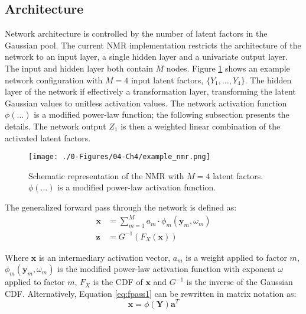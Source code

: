 \subsection{Architecture}
\label{subsec:arch}

Network architecture is controlled by the number of latent factors in the Gaussian pool. The current \gls{NMR} implementation restricts the architecture of the network to an input layer, a single hidden layer and a univariate output layer. The input and hidden layer both contain $M$ nodes. Figure \ref{fig:example_nmr} shows an example network configuration with $M=4$ input latent factors, $\{ Y_{1}, \dots, Y_{4}\}$. The hidden layer of the network if effectively a transformation layer, transforming the latent Gaussian values to unitless activation values. The network activation function $\phi(\dots)$ is a modified power-law function; the following subsection presents the details. The network output $Z_{1}$ is then a weighted linear combination of the activated latent factors.

\begin{figure}[htb!]
    \centering
    \texttt{[image: ./0-Figures/04-Ch4/example\_nmr.png]}
    \caption{Schematic representation of the \gls{NMR} with $M=4$ latent factors. $\phi(\dots)$ is a modified power-law activation function. }
    \label{fig:example_nmr}
\end{figure}

The generalized forward pass through the network is defined as:
\begin{align}
    \label{eq:fpass1}
    \mathbf{x} & = \sum_{m=1}^{M}a_{m} \cdot \phi_{m}(\mathbf{y}_{m}, \omega_{m}) \\
    \label{eq:fpass2}
    \mathbf{z} & = G^{-1}\left( F_{X}\left(\mathbf{x} \right)\right)
\end{align}

Where $\mathbf{x}$ is an intermediary activation vector, $a_{m}$ is a weight applied to factor $m$, $\phi_{m}(\mathbf{y}_{m}, \omega_{m})$ is the modified power-law activation function with exponent $\omega$ applied to factor $m$, $F_{X}$ is the \gls{CDF} of $\mathbf{x}$ and $G^{-1}$ is the inverse of the Gaussian \gls{CDF}. Alternatively, Equation \ref{eq:fpass1} can be rewritten in matrix notation as:
\begin{equation}
    \mathbf{x} = \phi\left( \mathbf{Y} \right) \mathbf{a}^{T}
    \label{eq:fpass3}
\end{equation}

